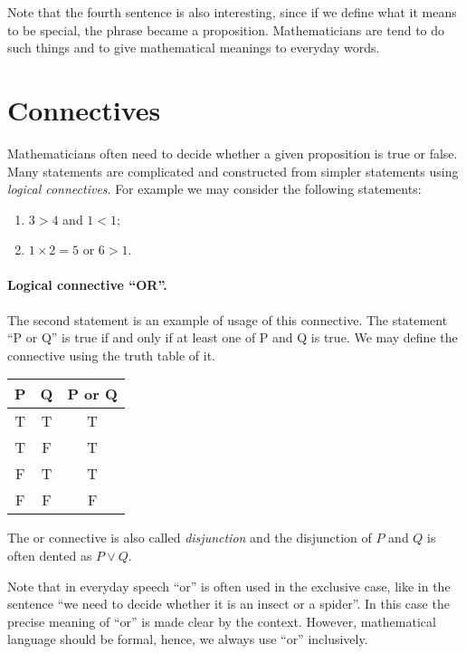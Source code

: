 Note that the fourth sentence is also interesting, since if we define what it
means to be special, the phrase became a proposition.
Mathematicians are tend to do such things and to give mathematical meanings to
everyday words.

\section{Connectives}

Mathematicians often need to decide whether a given proposition is true or
false. Many statements are complicated and constructed from simpler statements
using \textit{logical connectives}. For example we may consider the following
statements:
\begin{enumerate}
  \item $3 > 4$ and $1 < 1$;
  \item $1 \times 2 = 5$ or $6 > 1$.
\end{enumerate}

\paragraph{Logical connective ``OR''.}
The second statement is an example of usage of this connective. The statement
``P or Q'' is true if and only if at least one of P and Q is true. We may
define the connective using the truth table of it.
\begin{center}
  \begin{tabular}{c | c | c}
    P & Q & P or Q \\
    \hline
    T & T & T \\
    T & F & T \\
    F & T & T \\
    F & F & F
  \end{tabular}
\end{center}

The or connective is also called \textit{disjunction} and the disjunction of $P$
and $Q$ is often dented as $P \lor Q$.

\begin{warning}
  Note that in everyday speech ``or'' is often used in the exclusive case, like
  in the sentence ``we need to decide whether it is an insect or a spider''.
  In this case the precise meaning of ``or'' is made clear by the context.
  However, mathematical language should be formal, hence, we always use ``or''
  inclusively.
\end{warning}

